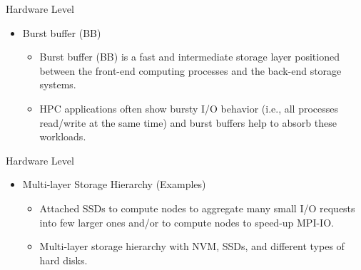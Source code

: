 \documentclass[compress,11pt,xcolor=svgnames,aspectratio=169]{beamer}
\begin{document}
\begin{frame}[t]{Hardware Level}

\begin{itemize}

    \item Burst buffer (BB)\\[0.4cm]

      \begin{itemize}
      \setlength\itemsep{0.6cm}

      \item Burst buffer (BB) is a fast and intermediate storage layer positioned between the front-end computing processes and the back-end storage systems.

      \item HPC applications often show bursty I/O behavior (i.e., all processes read/write at the same time) and burst buffers help to absorb these workloads.

      \end{itemize}

\end{itemize}

\end{frame}

\begin{frame}[t]{Hardware Level}

\begin{itemize}

      \item Multi-layer Storage Hierarchy (Examples)\\[0.4cm]

        \begin{itemize}
        \setlength\itemsep{0.6cm}

        \item Attached SSDs to compute nodes to aggregate many small I/O requests into few larger ones and/or to compute nodes to speed-up MPI-IO.

        \item Multi-layer storage hierarchy with NVM, SSDs, and different types of hard disks. %

        \end{itemize}

\end{itemize}

\end{frame}
\end{document}
